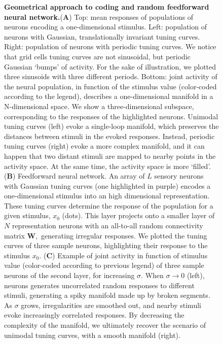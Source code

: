 \documentclass[a4paper]{article}%
\begin{document}
%

\newpage\begin{figure}[ptb]
\centering
{}
\caption{\textbf{Geometrical
approach to coding and random feedforward neural network.}(\textbf{A}) Top:
mean responses of populations of neurons encoding a one-dimensional stimulus.
Left: population of neurons with Gaussian, translationally invariant tuning
curves. Right: population of neurons with periodic tuning curves. We notice that grid cells
tuning curves are not sinusoidal, but periodic Gaussian `bumps' of activity.
For the sake of illustration, we plotted three sinusoids with
three different periods. Bottom: joint activity of the neural population,
in function of the stimulus value (color-coded according to the legend),
describes a one-dimensional manifold in a N-dimensional space. We show a three-dimensional
subspace, corresponding to the responses of the highlighted neurons. Unimodal
tuning curves (left) evoke a single-loop manifold, which preserves the
distances between stimuli in the evoked responses. Instead, periodic tuning
curves (right) evoke a more complex manifold, and it can happen that two
distant stimuli are mapped to nearby points in the activity space. At the same
time, the activity space is more `filled'. (\textbf{B}) Feedforward neural
network. An array of  $L$  sensory neurons with Gaussian tuning curves (one highlighted in
purple) encodes a one-dimensional stimulus into an high dimensional
representation. These tuning curves determine the response of the population
for a given stimulus, $x_{0}$ (dots). This layer projects onto a smaller
layer of $N$ representation neurons with an all-to-all random connectivity matrix $\mathbf{W},$
generating irregular responses. We plotted the tuning curves of three sample
neurons, highlighting their response to the  stimulus $x_{0}$.
(\textbf{C}) Example of joint activity in function of stimulus value
(color-coded according to previous legend) of three sample neurons of the
second layer, for increasing $\sigma$. When $\sigma\rightarrow0$ (left),
neurons generates uncorrelated random responses to different stimuli,
generating a spiky manifold made up by broken segments. As $\sigma$ grows,
irregularities are smoothed out, and nearby stimuli evoke increasingly
correlated responses. By decreasing the complexity of the manifold, we
ultimately recover the scenario of unimodal tuning curves, with a smooth
manifold (right).}
\label{Fig:1}
\end{figure}\clearpage
\end{document}
